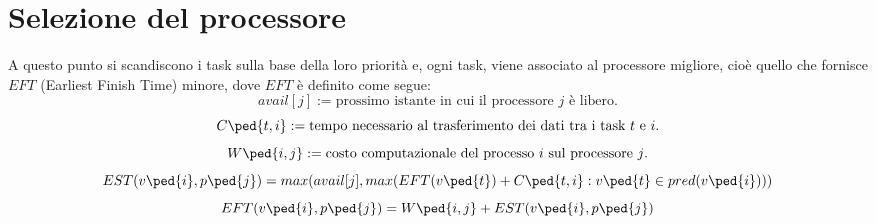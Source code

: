 \section{Selezione del processore}
A questo punto si scandiscono i task sulla base della loro priorità e, ogni task, viene associato al processore migliore, cioè quello che fornisce $EFT$ (Earliest Finish Time) minore, dove $EFT$ è definito come segue:
\begin{displaymath}
	avail[j] := \text{prossimo istante in cui il processore $j$ è libero.}
\end{displaymath}
\begin{displaymath}
	C\ped{t,i} := \text{tempo necessario al trasferimento dei dati tra i task $t$ e $i$.} 
\end{displaymath}
\begin{displaymath}
	W\ped{i,j} := \text{costo computazionale del processo $i$ sul processore $j$.} 
\end{displaymath}
\begin{equation}\label{EST}
	EST(v\ped{i},p\ped{j}) = max(avail[j], max(EFT(v\ped{t}) + C\ped{t,i} : v\ped{t} \in pred(v\ped{i})))
\end{equation}
\begin{equation}\label{EFT}
	EFT(v\ped{i},p\ped{j}) = W\ped{i,j} + EST(v\ped{i},p\ped{j})
\end{equation}